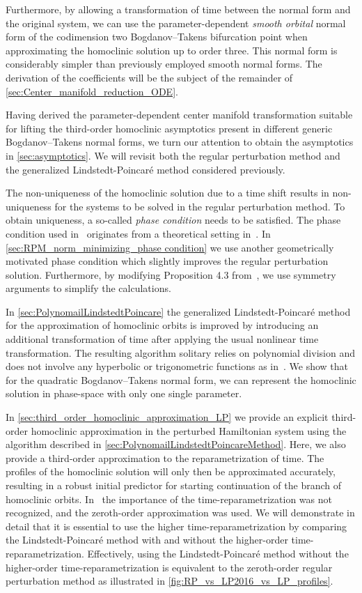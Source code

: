 Furthermore, by allowing a transformation of time between the normal form and
the original system, we can use the parameter-dependent \emph{smooth orbital}
normal form of the codimension two Bogdanov--Takens bifurcation point when
approximating the homoclinic solution up to order three. This normal form is
considerably simpler than previously employed smooth normal forms. The
derivation of the coefficients will be the subject of the remainder of
\cref{sec:Center_manifold_reduction_ODE}.

Having derived the parameter-dependent center manifold transformation suitable for
lifting the third-order homoclinic asymptotics present in different generic
Bogdanov--Takens normal forms, we turn our attention to obtain the asymptotics
in \cref{sec:asymptotics}. We will revisit both the regular perturbation method and
the generalized Lindstedt-Poincar\'e method considered previously.

The non-uniqueness of the homoclinic solution due to a time shift results in
non-uniqueness for the systems to be solved in the regular perturbation method.
To obtain uniqueness, a so-called \emph{phase condition} needs to be satisfied.
The phase condition used in~\cite{Kuznetsov2014improved} originates from a
theoretical setting in~\cite{Beyn_1994}. In \cref{sec:RPM_norm_minimizing_phase
condition} we use another geometrically motivated phase condition which slightly
improves the regular perturbation solution. Furthermore, by modifying
Proposition 4.3 from~\cite{Beyn_1994}, we use symmetry arguments to simplify
the calculations.

In \cref{sec:PolynomailLindstedtPoincare} the generalized Lindstedt-Poincar\'e
method for the approximation of homoclinic orbits is improved by introducing an
additional transformation of time after applying the usual nonlinear time
transformation. The resulting algorithm solitary relies on polynomial division
and does not involve any hyperbolic or trigonometric functions as
in~\cite{Algaba_2019,Al-Hdaibat2016}. We show that for the quadratic Bogdanov--Takens
normal form, we can represent the homoclinic solution in phase-space with
only one single parameter.

In \cref{sec:third_order_homoclinic_approximation_LP} we provide an explicit
third-order homoclinic approximation in the perturbed Hamiltonian system using
the algorithm described in \cref{sec:PolynomailLindstedtPoincareMethod}. Here, we also
provide a third-order approximation to the reparametrization of time. The
profiles of the homoclinic solution will only then be approximated accurately,
resulting in a robust initial predictor for starting continuation of the branch
of homoclinic orbits.  In~\cite{Al-Hdaibat2016} the importance of the
time-reparametrization was not recognized, and the zeroth-order approximation
was used. We will demonstrate in detail that it is essential to use the higher
time-reparametrization by comparing the Lindstedt-Poincar\'e method with and
without the higher-order time-reparametrization.  Effectively, using the
Lindstedt-Poincar\'e method without the higher-order time-reparametrization is
equivalent to the zeroth-order regular perturbation method as illustrated in
\cref{fig:RP_vs_LP2016_vs_LP_profiles}.

